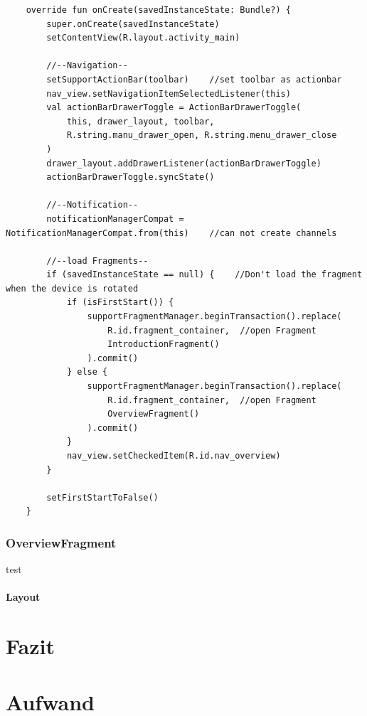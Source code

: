 \documentclass[a4paper]{article}
\begin{document}
\begin{verbatim}
	override fun onCreate(savedInstanceState: Bundle?) {
        super.onCreate(savedInstanceState)
        setContentView(R.layout.activity_main)

        //--Navigation--
        setSupportActionBar(toolbar)    //set toolbar as actionbar
        nav_view.setNavigationItemSelectedListener(this)
        val actionBarDrawerToggle = ActionBarDrawerToggle(
            this, drawer_layout, toolbar,
            R.string.manu_drawer_open, R.string.menu_drawer_close
        )
        drawer_layout.addDrawerListener(actionBarDrawerToggle)
        actionBarDrawerToggle.syncState()

        //--Notification--
        notificationManagerCompat = NotificationManagerCompat.from(this)    //can not create channels

        //--load Fragments--
        if (savedInstanceState == null) {    //Don't load the fragment when the device is rotated
            if (isFirstStart()) {
                supportFragmentManager.beginTransaction().replace(
                    R.id.fragment_container,  //open Fragment
                    IntroductionFragment()
                ).commit()
            } else {
                supportFragmentManager.beginTransaction().replace(
                    R.id.fragment_container,  //open Fragment
                    OverviewFragment()
                ).commit()
            }
            nav_view.setCheckedItem(R.id.nav_overview)
        }

        setFirstStartToFalse()
    }
\end{verbatim}

\subsubsection{OverviewFragment}
test

\paragraph{Layout}

\subsection{}

\section{Fazit}

\section{Aufwand}
\end{document}
